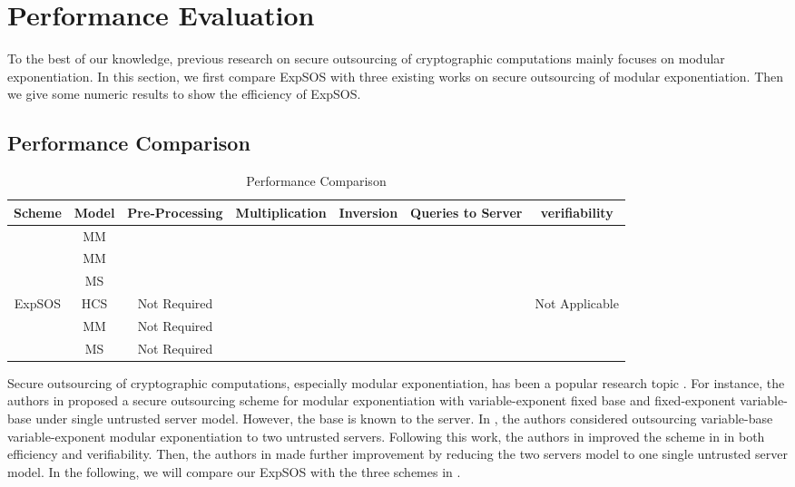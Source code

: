 \documentclass[english,draftcls,onecolumn,11pt]{IEEEtran}
\providecommand{\tabularnewline}{\\}
\theoremstyle{definition}
\theoremstyle{plain}
\theoremstyle{plain}
\theoremstyle{definition}
\begin{document}
\section{Performance Evaluation\label{sec:Performance-Comparison}}

To the best of our knowledge, previous research on secure outsourcing
of cryptographic computations mainly focuses on modular exponentiation.
In this section, we first compare ExpSOS with three existing works
on secure outsourcing of modular exponentiation. Then we give some
numeric results to show the efficiency of ExpSOS.


\subsection{Performance Comparison}

\begin{table*}
\caption{Performance Comparison\label{tab:Performance-Comparison-1}}


\begin{spacing}{1.1}
\centering{}\begin{tabular}{|c|c|c|c|c|c|c|}
\hline 
\textbf{Scheme} & \textbf{Model} & \textbf{Pre-Processing} & \textbf{Multiplication} & \textbf{Inversion} & \textbf{Queries to Server} & \textbf{verifiability}\tabularnewline
\hline 
\hline 
\cite{hohenberger2005securely} & MM &   &    &  &  & \tabularnewline
\hline 
\cite{chen2012new} & MM &    &   &  &  & \tabularnewline
\hline 
\cite{wang2014securely} & MS &    &   &  &  & \tabularnewline
\hline 
\multirow{3}{*}{ExpSOS} & HCS & Not Required &  &  &  & Not Applicable\tabularnewline
\cline{2-7} 
 & MM & Not Required &  &  &  & \tabularnewline
\cline{2-7} 
 & MS & Not Required &  &  &  & \tabularnewline
\hline 
\end{tabular}\end{spacing}
\end{table*}


Secure outsourcing of cryptographic computations, especially modular
exponentiation, has been a popular research topic \cite{hohenberger2005securely,chen2012new,wang2014securely,matsumoto1990speeding,de1997schnorr,boyko1998speeding,nguyen2001distribution,van2006speeding}.
For instance, the authors in \cite{van2006speeding} proposed a secure
outsourcing scheme for modular exponentiation with variable-exponent
fixed base and fixed-exponent variable-base under single untrusted
server model. However, the base is known to the server. In \cite{hohenberger2005securely},
the authors considered outsourcing variable-base variable-exponent
modular exponentiation to two untrusted servers. Following this work,
the authors in \cite{chen2012new} improved the scheme in \cite{hohenberger2005securely}
in both efficiency and verifiability. Then, the authors in \cite{wang2014securely}
made further improvement by reducing the two servers model to one
single untrusted server model. In the following, we will compare our
ExpSOS with the three schemes in \cite{hohenberger2005securely,chen2012new,wang2014securely}.
\end{document}
